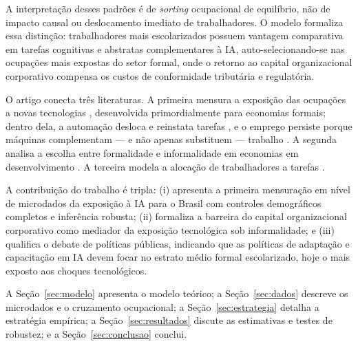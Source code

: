 A interpretação desses padrões é de \emph{sorting} ocupacional de equilíbrio, não de impacto causal ou deslocamento imediato de trabalhadores. O modelo formaliza essa distinção: trabalhadores mais escolarizados possuem vantagem comparativa em tarefas cognitivas e abstratas complementares à IA, auto-selecionando-se nas ocupações mais expostas do setor formal, onde o retorno ao capital organizacional corporativo compensa os custos de conformidade tributária e regulatória.

O artigo conecta três literaturas. A primeira mensura a exposição das ocupações a novas tecnologias \citep{frey2017future,acemoglu2022tasks,eloundou2024gpts}, desenvolvida primordialmente para economias formais; dentro dela, a automação desloca e reinstata tarefas \citep{acemoglu2019automation}, e o emprego persiste porque máquinas complementam --- e não apenas substituem --- trabalho \citep{autor2015why}. A segunda analisa a escolha entre formalidade e informalidade em economias em desenvolvimento \citep{ulyssea2018firms}. A terceira modela a alocação de trabalhadores a tarefas \citep{acemoglu2011skills,autordorn2013growth}.

A contribuição do trabalho é tripla: (i) apresenta a primeira mensuração em nível de microdados da exposição à IA para o Brasil com controles demográficos completos e inferência robusta; (ii) formaliza a barreira do capital organizacional corporativo como mediador da exposição tecnológica sob informalidade; e (iii) qualifica o debate de políticas públicas, indicando que as políticas de adaptação e capacitação em IA devem focar no estrato médio formal escolarizado, hoje o mais exposto aos choques tecnológicos.

A Seção~\ref{sec:modelo} apresenta o modelo teórico; a Seção~\ref{sec:dados} descreve os microdados e o cruzamento ocupacional; a Seção~\ref{sec:estrategia} detalha a estratégia empírica; a Seção~\ref{sec:resultados} discute as estimativas e testes de robustez; e a Seção~\ref{sec:conclusao} conclui.
